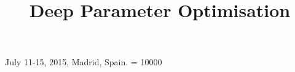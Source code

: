 \documentclass{sig-alternate}
\begin{document}
  {July 11-15, 2015, Madrid, Spain.}
    \widowpenalty = 10000

\title{Deep Parameter Optimisation}


%

\end{document}
